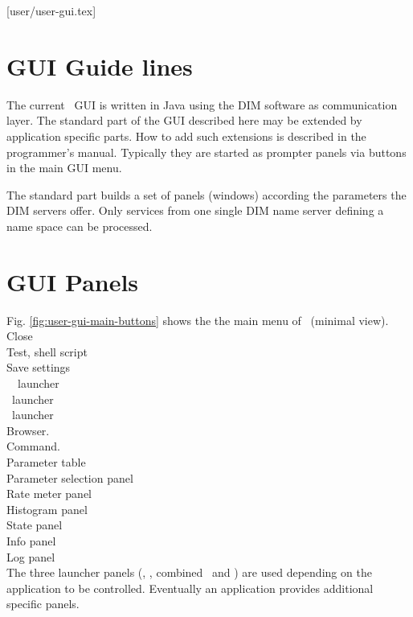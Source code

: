 [user/user-gui.tex]
\section{GUI Guide lines}
The current \dabc\ GUI is written in Java using the DIM software as communication layer.
The standard part of the GUI described here may be extended by application specific parts.
How to add such extensions is described in the programmer's manual.
Typically they are started as prompter panels via buttons in the
main GUI menu.

The standard part builds a set of panels (windows) according the parameters
the DIM servers offer. Only services from one single DIM name server
defining a name space can be processed.
\section{GUI Panels}
Fig. \ref{fig:user-gui-main-buttons} shows the the main menu of \dabc\ (minimal view).\\
 Close\\
 Test, shell script\\
 Save settings\\
 \dabc\ \mbs\ launcher\\
 \dabc\ launcher\\
 \mbs\ launcher\\
  Browser.\\
 Command.\\
 Parameter table\\
 Parameter selection panel\\
 Rate meter panel\\
 Histogram panel\\
 State panel\\
 Info panel\\
 Log panel\\
The three launcher panels (\dabc, \mbs, combined \dabc\ and \mbs) 
are used depending on the
application to be controlled. Eventually an application provides 
additional specific panels.

